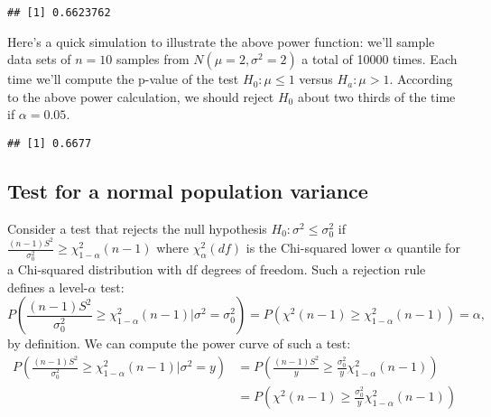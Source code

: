 \documentclass[
]{book}
\newenvironment{Shaded}{\begin{snugshade}}{\end{snugshade}}
\newcommand{\AttributeTok}[1]{\textcolor[rgb]{0.77,0.63,0.00}{#1}}
\newcommand{\ConstantTok}[1]{\textcolor[rgb]{0.00,0.00,0.00}{#1}}
\newcommand{\ControlFlowTok}[1]{\textcolor[rgb]{0.13,0.29,0.53}{\textbf{#1}}}
\newcommand{\DecValTok}[1]{\textcolor[rgb]{0.00,0.00,0.81}{#1}}
\newcommand{\FloatTok}[1]{\textcolor[rgb]{0.00,0.00,0.81}{#1}}
\newcommand{\FunctionTok}[1]{\textcolor[rgb]{0.00,0.00,0.00}{#1}}
\newcommand{\NormalTok}[1]{#1}
\newcommand{\OtherTok}[1]{\textcolor[rgb]{0.56,0.35,0.01}{#1}}
\newcommand{\SpecialCharTok}[1]{\textcolor[rgb]{0.00,0.00,0.00}{#1}}
\newcommand{\StringTok}[1]{\textcolor[rgb]{0.31,0.60,0.02}{#1}}
\begin{document}
\begin{verbatim}
## [1] 0.6623762
\end{verbatim}

Here's a quick simulation to illustrate the above power function: we'll sample data sets of \(n=10\) samples from \(N(\mu = 2, \sigma^2 = 2)\) a total of 10000 times. Each time we'll compute the p-value of the test \(H_0:\mu \leq 1\) versus \(H_a:\mu > 1\). According to the above power calculation, we should reject \(H_0\) about two thirds of the time if \(\alpha = 0.05\).

\begin{Shaded}
\end{Shaded}

\begin{verbatim}
## [1] 0.6677
\end{verbatim}

\hypertarget{test-for-a-normal-population-variance}{%
\subsection{Test for a normal population variance}\label{test-for-a-normal-population-variance}}

Consider a test that rejects the null hypothesis \(H_0:\sigma^2 \leq \sigma_0^2\) if \(\frac{(n-1)S^2}{\sigma_0^2} \geq \chi^2_{1-\alpha}(n-1)\) where \(\chi^2_{\alpha}(df)\) is the Chi-squared lower \(\alpha\) quantile for a Chi-squared distribution with df degrees of freedom. Such a rejection rule defines a level-\(\alpha\) test:
\[P\left(\frac{(n-1)S^2}{\sigma_0^2} \geq  \chi^2_{1-\alpha}(n-1)|\sigma^2 = \sigma_0^2\right) = P\left(\chi^{2}(n-1) \geq  \chi^2_{1-\alpha}(n-1)\right) = \alpha,\]
by definition. We can compute the power curve of such a test:
\begin{align*}
P\left(\frac{(n-1)S^2}{\sigma_0^2} \geq  \chi^2_{1-\alpha}(n-1)|\sigma^2 = y\right) & = P\left(\frac{(n-1)S^2}{y} \geq  \frac{\sigma_0^2}{y}\chi^2_{1-\alpha}(n-1)\right)\\
& = P\left(\chi^2(n-1) \geq  \frac{\sigma_0^2}{y}\chi^2_{1-\alpha}(n-1)\right)
\end{align*}
\end{document}
